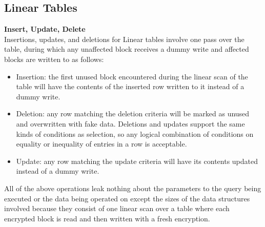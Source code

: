 \documentclass[conference]{IEEEtran}
\begin{document}
\subsection{Linear Tables}
\medskip \noindent \textbf{Insert, Update, Delete}\\
Insertions, updates, and deletions for Linear tables involve one pass over the table, during which any unaffected block receives a dummy write and affected blocks are written to as follows:
\begin{itemize}
\item Insertion: the first unused block encountered during the linear scan of the table will have the contents of the inserted row written to it instead of a dummy write.
\item Deletion: any row matching the deletion criteria will be marked as unused and overwritten with fake data. Deletions and updates support the same kinds of conditions as selection, so any logical combination of conditions on equality or inequality of entries in a row is acceptable. 
\item Update: any row matching the update criteria will have its contents updated instead of a dummy write. 
\end{itemize}

All of the above operations leak nothing about the parameters to the query being executed or the data being operated on except the sizes of the data structures involved because they consist of one linear scan over a table where each encrypted block is read and then written with a fresh encryption. 
\end{document}
